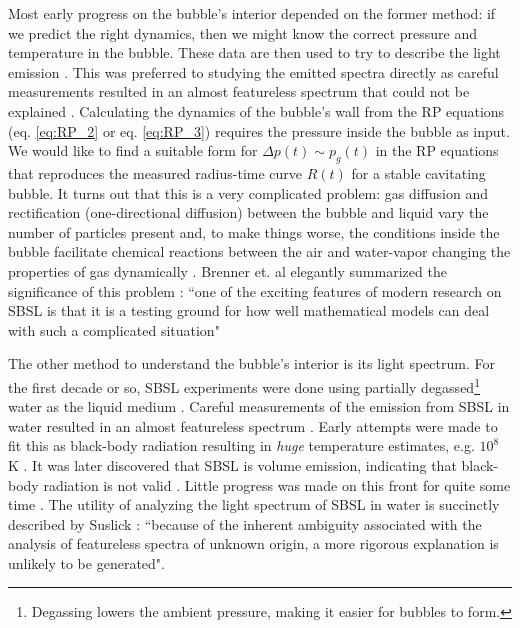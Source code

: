 \documentclass[rmp,aps,nofootinbib,superscriptaddress,floatfix]{revtex4-2}
\begin{document}
Most early progress on the bubble's interior depended on the former method: if we predict the right dynamics, then we might know the correct pressure and temperature in the bubble. These data are then used to try to describe the light emission \cite{}. This was preferred to studying the emitted spectra directly as careful measurements resulted in an almost featureless spectrum that could not be explained \cite{}. Calculating the dynamics of the bubble's wall from the RP equations (eq. \ref{eq:RP_2} or eq. \ref{eq:RP_3}) requires the pressure inside the bubble as input. We would like to find a suitable form for $\Delta p(t) \sim p_g(t)$ in the RP equations that reproduces the measured radius-time curve $R(t)$ for a stable cavitating bubble. It turns out that this is a very complicated problem: gas diffusion and rectification (one-directional diffusion) between the bubble and liquid vary the number of particles present and, to make things worse, the conditions inside the bubble facilitate chemical reactions between the air and water-vapor changing the properties of gas dynamically \cite{brenner2002single}. Brenner et. al elegantly summarized the significance of this problem \cite{brenner2002single}: ``one of the exciting features of modern research on SBSL is that it is a testing ground for how well mathematical models can deal with such a complicated situation"

The other method to understand the bubble's interior is its light spectrum. For the first decade or so, SBSL experiments were done using partially degassed\footnote{Degassing lowers the ambient pressure, making it easier for bubbles to form.} water as the liquid medium \cite{suslick2008inside,brenner2002single,gaitan1992sonoluminescence}. Careful measurements of the emission from SBSL in water resulted in an almost featureless spectrum \cite{}. Early attempts were made to fit this as black-body radiation resulting in \emph{huge} temperature estimates, e.g. $10^8$ K \cite{}. It was later discovered that SBSL is volume emission, indicating that black-body radiation is not valid \cite{hilgenfeldt1999simple,hilgenfeldt1999sonoluminescence}. Little progress was made on this front for quite some time \cite{brenner2002single}. The utility of analyzing the light spectrum of SBSL in water is succinctly described by Suslick \cite{suslick2008inside}: ``because of the inherent ambiguity associated with the analysis of featureless spectra of unknown origin, a more rigorous explanation is unlikely to be generated". 
\end{document}
